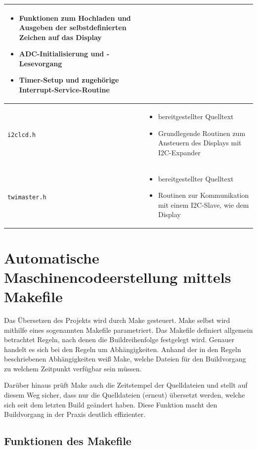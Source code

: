 \begin{center}
\begin{longtable}{|p{}|p{}|}
\begin{itemize}
					\setlength\itemsep{-0.5em}
					\item Funktionen zum Hochladen und Ausgeben der selbstdefinierten Zeichen auf das Display
					\item ADC-Initialisierung und -Lesevorgang
					\item Timer-Setup und zugehörige Interrupt-Service-Routine
					\end{itemize} 
\\ 
\hline
\texttt{i2clcd.h} &	\begin{itemize}
					\setlength\itemsep{-0.5em}
					\item bereitgestellter Quelltext
					\item Grundlegende Routinen zum Ansteuern des Displays mit I2C-Expander
					\end{itemize} 
\\ 
\hline 
\texttt{twimaster.h} &	\begin{itemize}
					\setlength\itemsep{-0.5em}
					\item bereitgestellter Quelltext
					\item Routinen zur Kommunikation mit einem I2C-Slave, wie dem Display
					\end{itemize} 
\\ 
\hline 
\end{longtable}
\end{center}

\section{Automatische Maschinencodeerstellung mittels Makefile}
\label{sec:Make}
Das Übersetzen des Projekts wird durch Make gesteuert. Make selbst
wird mithilfe eines sogenannten \textquotedbl Makefile\textquotedbl{}
parametriert. Das Makefile definiert allgemein betrachtet Regeln,
nach denen die Buildreihenfolge festgelegt wird. Genauer handelt es
sich bei den Regeln um Abhängigkeiten. Anhand der in den Regeln beschriebenen
Abhängigkeiten weiß Make, welche Dateien für den Buildvorgang zu welchem
Zeitpunkt verfügbar sein müssen.

Darüber hinaus prüft Make auch die Zeitstempel der Quelldateien und
stellt auf diesem Weg sicher, dass nur die Quelldateien (erneut) übersetzt
werden, welche sich seit dem letzten Build geändert haben. Diese Funktion
macht den Buildvorgang in der Praxis deutlich effizienter.

\subsection*{Funktionen des Makefile}

